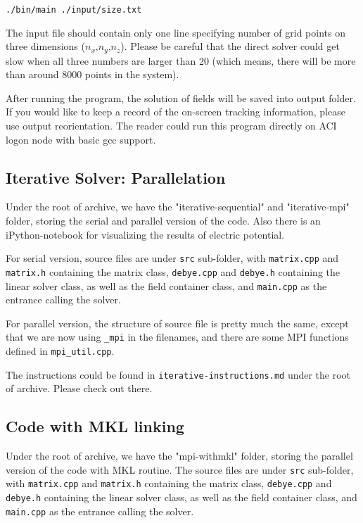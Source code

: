 \documentclass{article}
\begin{document}
\begin{spacing}{1.1}
\begin{appendices}
\texttt{./bin/main ./input/size.txt}

The input file should contain only one line specifying number of grid points on three dimensions ($n_x$,$n_y$,$n_z$). Please be careful that the direct solver could get slow when all three numbers are larger than 20 (which means, there will be more than around 8000 points in the system).

After running the program, the solution of fields will be saved into output folder. If you would like to keep a record of the on-screen tracking information, please use output reorientation. The reader could run this program directly on ACI logon node with basic gcc support.

\subsection{Iterative Solver: Parallelation}

Under the root of archive, we have the "iterative-sequential" and "iterative-mpi" folder, storing the serial and parallel version of the code. Also there is an iPython-notebook for visualizing the results of electric potential. 

For serial version, source files are under \texttt{src} sub-folder, with \texttt{matrix.cpp} and \texttt{matrix.h} containing the matrix class, \texttt{debye.cpp} and \texttt{debye.h} containing the linear solver class, as well as the field container class, and \texttt{main.cpp} as the entrance calling the solver.

For parallel version, the structure of source file is pretty much the same, except that we are now using \texttt{\_mpi} in the filenames, and there are some MPI functions defined in \texttt{mpi\_util.cpp}.

The instructions could be found in \texttt{iterative-instructions.md} under the root of archive. Please check out there.

\subsection{Code with MKL linking}

Under the root of archive, we have the "mpi-withmkl" folder, storing the parallel version of the code with MKL routine. The source files are under \texttt{src} sub-folder, with \texttt{matrix.cpp} and \texttt{matrix.h} containing the matrix class, \texttt{debye.cpp} and \texttt{debye.h} containing the linear solver class, as well as the field container class, and \texttt{main.cpp} as the entrance calling the solver.


\end{appendices}
\end{spacing}
\end{document}
